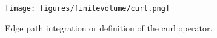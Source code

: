 \begin{figure}[ht]
\begin{center}
\texttt{[image: figures/finitevolume/curl.png]}
\end{center}
\caption{Edge path integration or definition of the curl operator.}
\label{fig:finitevolume-curl}
\end{figure}
